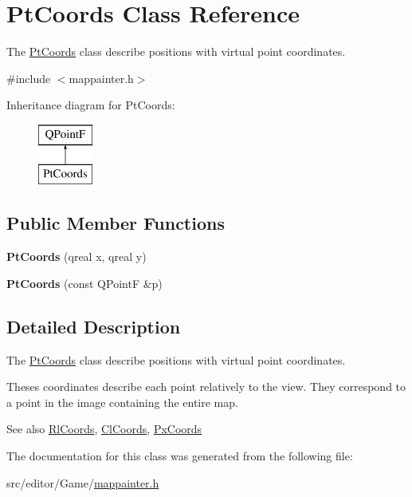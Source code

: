\hypertarget{class_pt_coords}{}\section{Pt\+Coords Class Reference}
\label{class_pt_coords}


The \hyperlink{class_pt_coords}{Pt\+Coords} class describe positions with virtual point coordinates.  




{\ttfamily \#include $<$mappainter.\+h$>$}

Inheritance diagram for Pt\+Coords\+:\begin{figure}[H]
\begin{center}
\leavevmode
\includegraphics[height=2.000000cm]{class_pt_coords}
\end{center}
\end{figure}
\subsection*{Public Member Functions}
\begin{DoxyCompactItemize}
\item 
\hypertarget{class_pt_coords_ad384f0c2b1e4ac127cfd2aa789810536}{}\label{class_pt_coords_ad384f0c2b1e4ac127cfd2aa789810536} 
{\bfseries Pt\+Coords} (qreal x, qreal y)
\item 
\hypertarget{class_pt_coords_a8e30f67406d22baf10a4556435562248}{}\label{class_pt_coords_a8e30f67406d22baf10a4556435562248} 
{\bfseries Pt\+Coords} (const Q\+PointF \&p)
\end{DoxyCompactItemize}


\subsection{Detailed Description}
The \hyperlink{class_pt_coords}{Pt\+Coords} class describe positions with virtual point coordinates. 

Theses coordinates describe each point relatively to the view. They correspond to a point in the image containing the entire map.

\begin{DoxySeeAlso}{See also}
\hyperlink{class_rl_coords}{Rl\+Coords}, \hyperlink{class_cl_coords}{Cl\+Coords}, \hyperlink{class_px_coords}{Px\+Coords} 
\end{DoxySeeAlso}


The documentation for this class was generated from the following file\+:\begin{DoxyCompactItemize}
\item 
src/editor/\+Game/\hyperlink{mappainter_8h}{mappainter.\+h}\end{DoxyCompactItemize}
